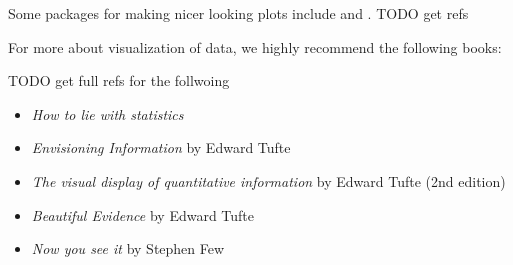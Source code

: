 Some packages for making nicer looking plots include  and .  TODO get refs

For more about visualization of data, we highly recommend the following books:

TODO get full refs for the follwoing

\begin{itemize}
\item \emph{How to lie with statistics}
\item \emph{Envisioning Information} by Edward Tufte
\item \emph{The visual display of quantitative information} by Edward Tufte (2nd edition)
\item \emph{Beautiful Evidence} by Edward Tufte
\item \emph{Now you see it} by Stephen Few
\end{itemize}


\printbibliography
